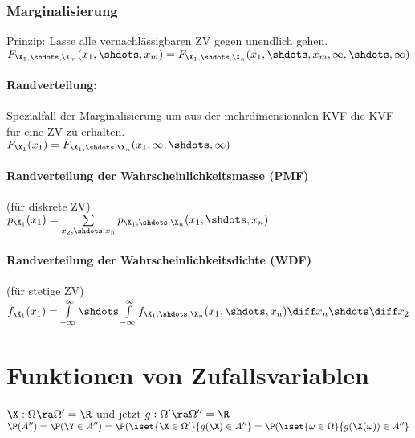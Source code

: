 \documentclass[german,color,6pt]{latex4ei/latex4ei_sheet}
\begin{document}
\begin{sectionbox}
	\subsubsection{Marginalisierung}
	Prinzip: Lasse alle vernachlässigbaren ZV gegen unendlich gehen. \\
	$F_{\X_1,\shdots,\X_m}(x_1,\shdots,x_m) =
	F_{\X_1,\shdots,\X_n}(x_1,\shdots,x_m,\infty,\shdots,\infty)$
	\paragraph{Randverteilung:}
	Spezialfall der Marginalisierung um aus der mehrdimensionalen KVF die KVF für eine ZV zu erhalten. \\
	$F_{\X_1}(x_1) =
	F_{\X_1,\shdots,\X_n}(x_1,\infty,\shdots,\infty)$

	\paragraph{Randverteilung der Wahrscheinlichkeitsmasse (PMF)}
	(für diskrete ZV) \\
	$p_{\X_1}(x_1) = \sum\limits_{x_2,\shdots,x_n}{p_{\X_1,\shdots,\X_n}(x_1,\shdots,x_n)}$

	\paragraph{Randverteilung der Wahrscheinlichkeitsdichte (WDF)} (für stetige ZV) \\
	$f_{\X_1}(x_1) = \int\limits_{-\infty}^{\infty}{\shdots\int\limits_{-\infty}^{\infty}{f_{\X_1,\shdots,\X_n}(x_1,\shdots,x_n)\diff x_n\shdots}\diff x_2}$
\end{sectionbox}

\section{Funktionen von Zufallsvariablen}
\begin{sectionbox}
	$\X: \Omega \ra \Omega' = \R$ und jetzt $g:\Omega' \ra \Omega'' = \R$\\
	$\P(A'') = \P(\Y \in A'') = \P(\iset{\X \in \Omega'}{g(\X) \in A''} = \P(\iset{\omega \in \Omega}{g(\X(\omega)) \in A''}$
\end{sectionbox}
\end{document}
